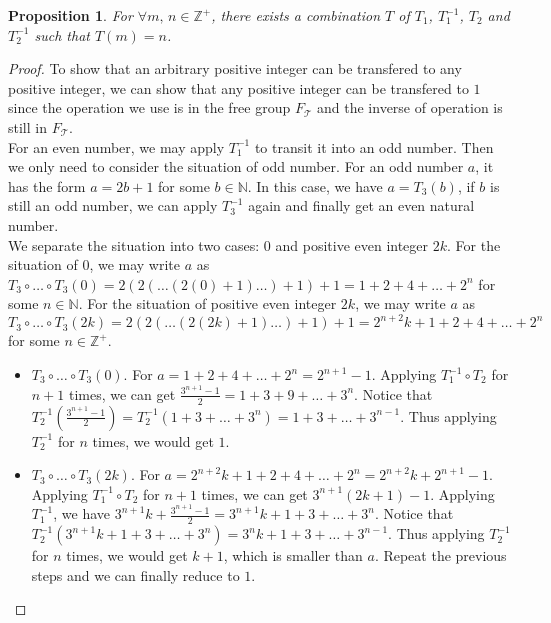 \documentclass{article}
\newtheorem{proposition}{\bf Proposition}
\begin{document}
\begin{proposition}
    For $\forall m,\,n \in \mathbb{Z}^+$, there exists a combination $T$ of $T_1$, $T_1^{-1}$, $T_2$ and $T_2^{-1}$ such that $T(m)=n$.
\end{proposition}
\begin{proof}
    To show that an arbitrary positive integer can be transfered to any positive integer, we can show that any positive integer can be transfered to $1$ since the operation we use is in the free group $F_{\mathcal{T}}$ and the inverse of operation is still in $F_{\mathcal{T}}$.\\
    For an even number, we may apply $T_1^{-1}$ to transit it into an odd number. Then we only need to consider the situation of odd number. For an odd number $a$, it has the form $a=2b+1$ for some $b\in\mathbb{N}$. In this case, we have $a=T_3(b)$, if $b$ is still an odd number, we can apply $T_3^{-1}$ again and finally get an even natural number.\\
    We separate the situation into two cases: $0$ and positive even integer $2k$. For the situation of $0$, we may write $a$ as $T_3\circ\ldots\circ T_3(0)=2(2(\ldots(2(0)+1)\ldots)+1)+1=1+2+4+\ldots+2^n$ for some $n\in\mathbb{N}$. For the situation of positive even integer $2k$, we may write $a$ as $T_3\circ\ldots\circ T_3(2k)=2(2(\ldots(2(2k)+1)\ldots)+1)+1=2^{n+2}k+1+2+4+\ldots+2^n$ for some $n\in\mathbb{Z}^+$.\\
    \begin{itemize}
        \item $T_3\circ\ldots\circ T_3(0)$. For $a=1+2+4+\ldots+2^n=2^{n+1}-1$. Applying $T_1^{-1}\circ T_2$ for $n+1$ times, we can get $\frac{3^{n+1}-1}{2}=1+3+9+\ldots+3^{n}$. Notice that $T_2^{-1}(\frac{3^{n+1}-1}{2})=T_2^{-1}(1+3+\ldots+3^{n})=1+3+\ldots+3^{n-1}$. Thus applying $T_2^{-1}$ for $n$ times, we would get $1$.
        \item $T_3\circ\ldots\circ T_3(2k)$. For $a=2^{n+2}k+1+2+4+\ldots+2^n=2^{n+2}k+2^{n+1}-1$. Applying $T_1^{-1}\circ T_2$ for $n+1$ times, we can get $3^{n+1}(2k+1)-1$. Applying $T_1^{-1}$, we have $3^{n+1}k+\frac{3^{n+1}-1}{2}=3^{n+1}k+1+3+\ldots+3^n$. Notice that $T_2^{-1}(3^{n+1}k+1+3+\ldots+3^n)=3^nk+1+3+\ldots+3^{n-1}$. Thus applying $T_2^{-1}$ for $n$ times, we would get $k+1$, which is smaller than $a$. Repeat the previous steps and we can finally reduce to $1$.
    \end{itemize}
\end{proof}
\end{document}
